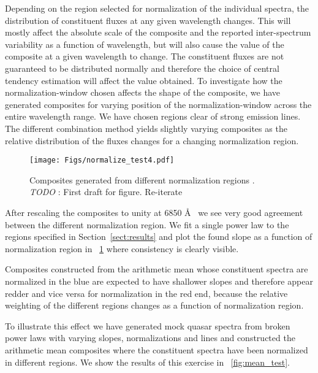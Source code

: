 \documentclass{aa}    %
\newcommand{\figref}[1]{\ref{fig:#1}}
\newcommand{\Fig}[1]{\figurename~\figref{#1}}
\newcommand{\fig}[1]{\Fig{#1}}
\newcommand{\figlabel}[1]{\label{fig:#1}}
\newcommand{\sectionname}{Section}
\newcommand{\Sect}[1]{\sectionname~\ref{sect:#1}}
\newcommand{\sect}[1]{\Sect{#1}}
\newcommand{\todo}[3]{{\color{#2}\emph{#1}: #3}}
\newcommand{\jstodo}[1]{\todo{ \\TODO }{green}{#1}}
\begin{document}
Depending on the region selected for normalization of the individual spectra, the distribution of constituent fluxes at any given wavelength changes. This will mostly affect the absolute scale of the composite and the reported inter-spectrum variability as a function of wavelength, but will also cause the value of the composite at a given wavelength to change. The constituent fluxes are not guaranteed to be distributed normally and therefore the choice of central tendency estimation will affect the value obtained. To investigate how the normalization-window chosen affects the shape of the composite, we have generated composites for varying position of the normalization-window across the entire wavelength range. We have chosen regions clear of strong emission lines. The different combination method yields slightly varying composites as the relative distribution of the fluxes changes for a changing normalization region.

 \begin{figure}[hbtp]
   \centering
   \texttt{[image: Figs/normalize\_test4.pdf]}
   \caption[]{Composites generated from different normalization regions . \jstodo{First draft for figure. Re-iterate}}
  \figlabel{norm_test}
 \end{figure}


After rescaling the composites to unity at 6850 \AA~ we see very good agreement between the different normalization region. We fit a single power law to the regions specified in \sect{results} and plot the found slope as a function of normalization region in \fig{norm_test} where consistency is clearly visible. 

Composites constructed from the arithmetic mean whose constituent spectra are normalized in the blue are expected to have shallower slopes and therefore appear redder and vice versa for normalization in the red end, because the relative weighting of the different regions changes as a function of normalization region. 

To illustrate this effect we have generated mock quasar spectra from broken power laws with varying slopes, normalizations and lines and constructed the arithmetic mean composites where the constituent spectra have been normalized in different regions. We show the results of this exercise in \fig{mean_test}.
\end{document}
